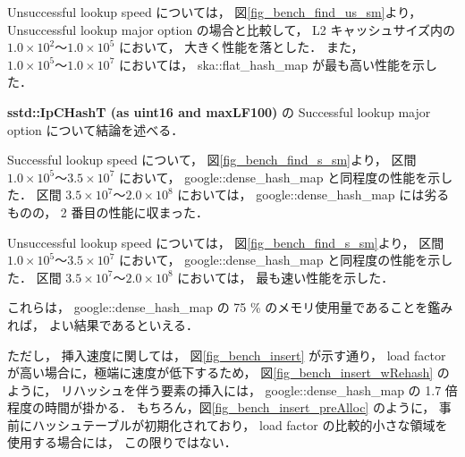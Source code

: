Unsuccessful lookup speed については，
図\ref{fig_bench_find_us_sm}より，
Unsuccessful lookup major option の場合と比較して，
L2 キャッシュサイズ内の $1.0\times10^2〜1.0\times10^5$ において，
大きく性能を落とした．
また，$1.0\times10^5〜1.0\times10^7$ においては，
ska::flat\_hash\_map が最も高い性能を示した．
\newline

{\bf sstd::IpCHashT (as uint16 and maxLF100)} の Successful lookup major option について結論を述べる．

Successful lookup speed について，
図\ref{fig_bench_find_s_sm}より，
区間 $1.0\times10^5〜3.5\times10^7$ において，
google::dense\_hash\_map と同程度の性能を示した．
区間 $3.5\times10^7〜2.0\times10^8$ においては，
google::dense\_hash\_map には劣るものの，
2 番目の性能に収まった．

Unsuccessful lookup speed については，
図\ref{fig_bench_find_s_sm}より，
区間 $1.0\times10^5〜3.5\times10^7$ において，
google::dense\_hash\_map と同程度の性能を示した．
区間 $3.5\times10^7〜2.0\times10^8$ においては，
最も速い性能を示した．

これらは，
google::dense\_hash\_map の 75 \% のメモリ使用量であることを鑑みれば，
よい結果であるといえる．

ただし，
挿入速度に関しては，
図\ref{fig_bench_insert} が示す通り，
load factor が高い場合に，極端に速度が低下するため，
図\ref{fig_bench_insert_wRehash} のように，
リハッシュを伴う要素の挿入には，
google::dense\_hash\_map の 1.7 倍程度の時間が掛かる．
もちろん，図\ref{fig_bench_insert_preAlloc} のように，
事前にハッシュテーブルが初期化されており，
load factor の比較的小さな領域を使用する場合には，
この限りではない．








